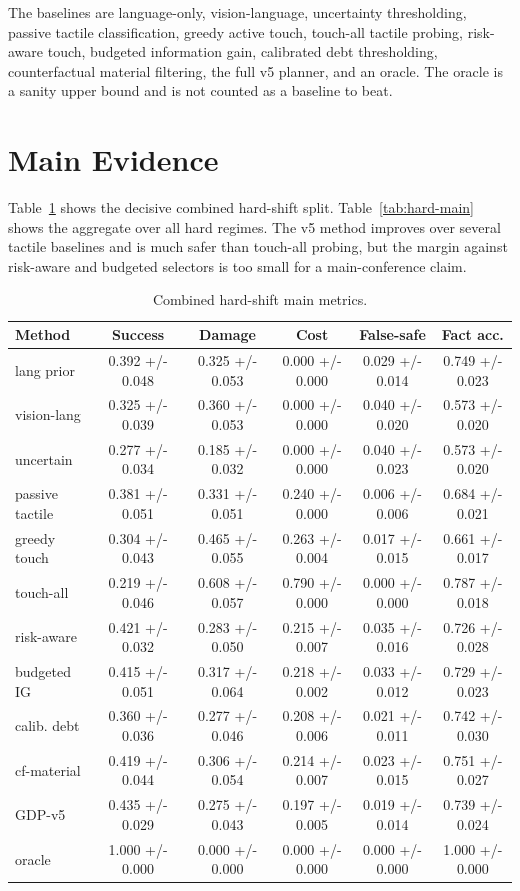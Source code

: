 \documentclass{article}
\begin{document}
The baselines are language-only, vision-language, uncertainty thresholding, passive tactile classification, greedy active touch, touch-all tactile probing, risk-aware touch, budgeted information gain, calibrated debt thresholding, counterfactual material filtering, the full v5 planner, and an oracle. The oracle is a sanity upper bound and is not counted as a baseline to beat.

\section{Main Evidence}
Table~\ref{tab:combined-main} shows the decisive combined hard-shift split. Table~\ref{tab:hard-main} shows the aggregate over all hard regimes. The v5 method improves over several tactile baselines and is much safer than touch-all probing, but the margin against risk-aware and budgeted selectors is too small for a main-conference claim.


\begin{table}[tbp]
\centering
\scriptsize
\setlength{\tabcolsep}{3pt}
\begin{tabular}{lccccc}
\toprule
Method & Success & Damage & Cost & False-safe & Fact acc. \\
\midrule
lang prior & 0.392 +/- 0.048 & 0.325 +/- 0.053 & 0.000 +/- 0.000 & 0.029 +/- 0.014 & 0.749 +/- 0.023 \\
vision-lang & 0.325 +/- 0.039 & 0.360 +/- 0.053 & 0.000 +/- 0.000 & 0.040 +/- 0.020 & 0.573 +/- 0.020 \\
uncertain & 0.277 +/- 0.034 & 0.185 +/- 0.032 & 0.000 +/- 0.000 & 0.040 +/- 0.023 & 0.573 +/- 0.020 \\
passive tactile & 0.381 +/- 0.051 & 0.331 +/- 0.051 & 0.240 +/- 0.000 & 0.006 +/- 0.006 & 0.684 +/- 0.021 \\
greedy touch & 0.304 +/- 0.043 & 0.465 +/- 0.055 & 0.263 +/- 0.004 & 0.017 +/- 0.015 & 0.661 +/- 0.017 \\
touch-all & 0.219 +/- 0.046 & 0.608 +/- 0.057 & 0.790 +/- 0.000 & 0.000 +/- 0.000 & 0.787 +/- 0.018 \\
risk-aware & 0.421 +/- 0.032 & 0.283 +/- 0.050 & 0.215 +/- 0.007 & 0.035 +/- 0.016 & 0.726 +/- 0.028 \\
budgeted IG & 0.415 +/- 0.051 & 0.317 +/- 0.064 & 0.218 +/- 0.002 & 0.033 +/- 0.012 & 0.729 +/- 0.023 \\
calib. debt & 0.360 +/- 0.036 & 0.277 +/- 0.046 & 0.208 +/- 0.006 & 0.021 +/- 0.011 & 0.742 +/- 0.030 \\
cf-material & 0.419 +/- 0.044 & 0.306 +/- 0.054 & 0.214 +/- 0.007 & 0.023 +/- 0.015 & 0.751 +/- 0.027 \\
GDP-v5 & 0.435 +/- 0.029 & 0.275 +/- 0.043 & 0.197 +/- 0.005 & 0.019 +/- 0.014 & 0.739 +/- 0.024 \\
oracle & 1.000 +/- 0.000 & 0.000 +/- 0.000 & 0.000 +/- 0.000 & 0.000 +/- 0.000 & 1.000 +/- 0.000 \\
\bottomrule
\end{tabular}
\caption{Combined hard-shift main metrics.}
\label{tab:combined-main}
\end{table}
\end{document}
